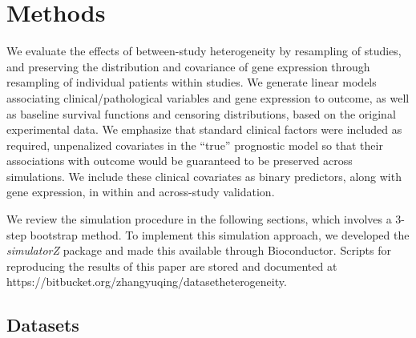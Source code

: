 \documentclass{bioinfo}
\begin{document}
\section{Methods}


We evaluate the effects of between-study heterogeneity
   by resampling of studies, and preserving the distribution and
  covariance of gene expression through resampling of
  individual patients within studies.  We generate linear models 
  associating clinical/pathological variables and gene expression to outcome, as
  well as baseline survival functions and censoring distributions,
  based on the original experimental data.  We
  emphasize that standard clinical factors were included as required,
  unpenalized covariates in the ``true'' prognostic model so that
  their associations with outcome would be guaranteed to be preserved
  across simulations. 
  We include these clinical covariates as binary predictors, along with
  gene expression, in within and across-study validation.   
  
  We review the simulation procedure in the following sections, 
  which involves a 3-step bootstrap method. To implement this simulation approach, 
  we developed the \emph{simulatorZ} package and made this available through Bioconductor. Scripts for reproducing
  the results of this paper are stored and documented at
  \\ https://bitbucket.org/zhangyuqing/datasetheterogeneity. 

  \subsection{Datasets}
\end{document}
